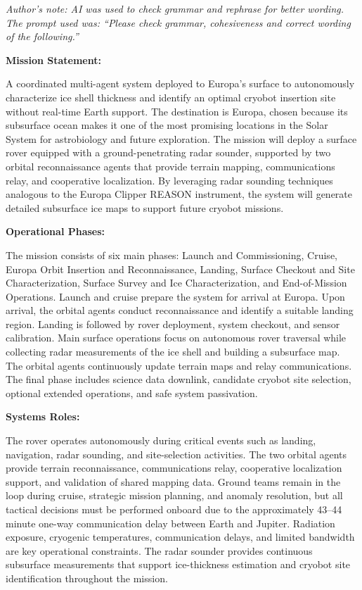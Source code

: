 \documentclass[11pt]{article}
\begin{document}
\textit{Author's note: AI was used to check grammar and rephrase for better wording. The prompt used was: ``Please check grammar, cohesiveness and correct wording of the following.''}

\vspace{1em}

\noindent\textbf{Mission Statement:}

A coordinated multi-agent system deployed to Europa's surface to autonomously characterize 
ice shell thickness and identify an optimal cryobot insertion site without real-time Earth
support. The destination is Europa, chosen because its subsurface ocean makes it one of the
most promising locations in the Solar System for astrobiology and future exploration. 
The mission will deploy a surface rover equipped with a ground-penetrating radar sounder, 
supported by two orbital reconnaissance agents that provide terrain mapping, communications 
relay, and cooperative localization. By leveraging radar sounding techniques analogous to the 
Europa Clipper REASON instrument, the system will generate detailed subsurface ice maps to 
support future cryobot missions.

\vspace{1em}

\noindent\textbf{Operational Phases:}

The mission consists of six main phases: Launch and Commissioning, Cruise, Europa Orbit 
Insertion and Reconnaissance, Landing, Surface Checkout and Site Characterization, Surface 
Survey and Ice Characterization, and End-of-Mission Operations. Launch and cruise prepare the
system for arrival at Europa. Upon arrival, the orbital agents conduct reconnaissance and 
identify a suitable landing region. Landing is followed by rover deployment, system checkout, 
and sensor calibration. Main surface operations focus on autonomous rover traversal while 
collecting radar measurements of the ice shell and building a subsurface map. The orbital 
agents continuously update terrain maps and relay communications. The final phase includes 
science data downlink, candidate cryobot site selection, optional extended operations, and 
safe system passivation.

\vspace{1em}

\noindent\textbf{Systems Roles:}

The rover operates autonomously during critical events such as landing, navigation, radar 
sounding, and site-selection activities. The two orbital agents provide terrain reconnaissance,
communications relay, cooperative localization support, and validation of shared mapping data. 
Ground teams remain in the loop during cruise, strategic mission planning, and anomaly 
resolution, but all tactical decisions must be performed onboard due to the approximately 
43--44 minute one-way communication delay between Earth and Jupiter. Radiation exposure, 
cryogenic temperatures, communication delays, and limited bandwidth are key operational
constraints. The radar sounder provides continuous subsurface measurements that support 
ice-thickness estimation and cryobot site identification throughout the mission.
\end{document}
